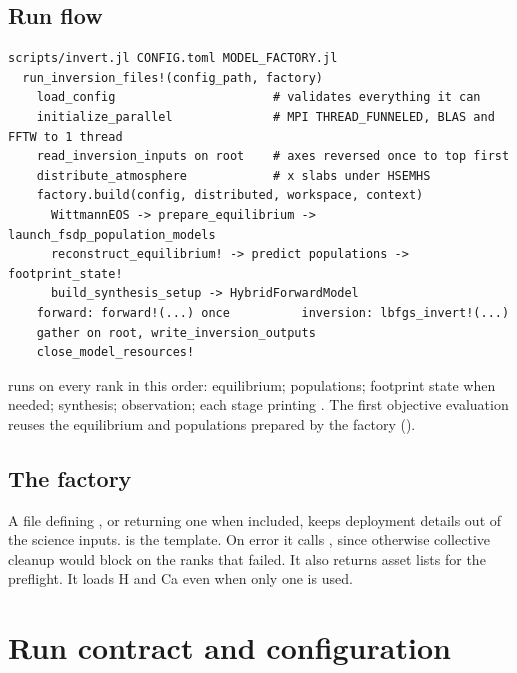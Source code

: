 \subsection{Run flow}
\begin{lstlisting}
scripts/invert.jl CONFIG.toml MODEL_FACTORY.jl
  run_inversion_files!(config_path, factory)
    load_config                      # validates everything it can
    initialize_parallel              # MPI THREAD_FUNNELED, BLAS and FFTW to 1 thread
    read_inversion_inputs on root    # axes reversed once to top first
    distribute_atmosphere            # x slabs under HSEMHS
    factory.build(config, distributed, workspace, context)
      WittmannEOS -> prepare_equilibrium -> launch_fsdp_population_models
      reconstruct_equilibrium! -> predict populations -> footprint_state!
      build_synthesis_setup -> HybridForwardModel
    forward: forward!(...) once          inversion: lbfgs_invert!(...)
    gather on root, write_inversion_outputs
    close_model_resources!
\end{lstlisting}

 runs on every rank in this order: equilibrium; populations; footprint state when needed; synthesis; observation; each stage printing . The first objective evaluation reuses the equilibrium and populations prepared by the factory ().

\subsection{The factory}
A file defining , or returning one when included, keeps deployment details out of the science inputs.  is the template. On error it calls , since otherwise collective cleanup would block on the ranks that failed. It also returns asset lists for the preflight. It loads H and Ca even when only one is used.

\section{Run contract and configuration}


